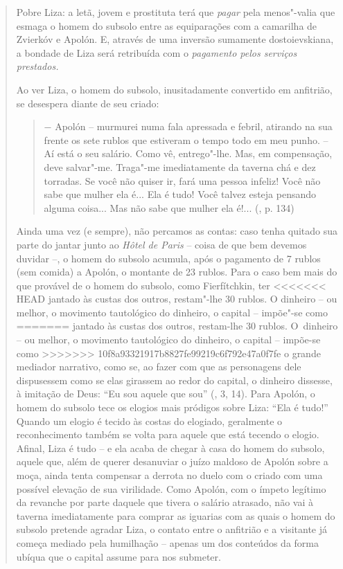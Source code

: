 {\begin{quote}
Pobre Liza: a letã, jovem e prostituta terá que \emph{pagar} pela
menos"-valia que esmaga o homem do subsolo entre as equiparações com a
camarilha de Zvierkóv e Apolón. E, através de uma inversão sumamente
dostoievskiana, a bondade de Liza será retribuída com o \emph{pagamento
pelos serviços prestados. }

Ao ver Liza, o homem do subsolo, inusitadamente convertido em anfitrião,
se desespera diante de seu criado:

\begin{quote}
− Apolón -- murmurei numa fala apressada e febril, atirando na sua
frente os sete rublos que estiveram o tempo todo em meu punho. -- Aí
está o seu salário. Como vê, entrego"-lhe. Mas, em compensação, deve
salvar"-me. Traga"-me imediatamente da taverna chá e dez torradas. Se você
não quiser ir, fará uma pessoa infeliz! Você não sabe que mulher ela
é... Ela é tudo! Você talvez esteja pensando alguma coisa... Mas não
sabe que mulher ela é!... (, p. 134)
\end{quote}

Ainda uma vez (e sempre), não percamos as contas: caso tenha quitado sua
parte do jantar junto ao \emph{Hôtel de Paris} -- coisa de que bem
devemos duvidar --, o homem do subsolo acumula, após o pagamento de 7
rublos (sem comida) a Apolón, o montante de 23 rublos. Para o caso bem
mais do que provável de o homem do subsolo, como Fierfítchkin, ter
<<<<<<< HEAD
jantado às custas dos outros, restam"-lhe 30 rublos. O dinheiro -- ou
melhor, o movimento tautológico do dinheiro, o capital -- impõe"-se como
=======
jantado às custas dos outros, restam-lhe 30 rublos. O~dinheiro -- ou
melhor, o movimento tautológico do dinheiro, o capital -- impõe-se como
>>>>>>> 10f8a93321917b8827fe99219c6f792e47a0f7fe
o grande mediador narrativo, como se, ao fazer com que as personagens
dele dispusessem como se elas girassem ao redor do capital, o dinheiro
dissesse, à imitação de Deus: ``Eu sou aquele que sou'' (, 3, 14).
Para Apolón, o homem do subsolo tece os elogios mais pródigos sobre
Liza: ``Ela é tudo!'' Quando um elogio é tecido às costas do elogiado,
geralmente o reconhecimento também se volta para aquele que está tecendo
o elogio. Afinal, Liza é tudo -- e ela acaba de chegar à casa do homem
do subsolo, aquele que, além de querer desanuviar o juízo maldoso de
Apolón sobre a moça, ainda tenta compensar a derrota no duelo com o
criado com uma possível elevação de sua virilidade. Como Apolón, com o
ímpeto legítimo da revanche por parte daquele que tivera o salário
atrasado, não vai à taverna imediatamente para comprar as iguarias com
as quais o homem do subsolo pretende agradar Liza, o contato entre o
anfitrião e a visitante já começa mediado pela humilhação -- apenas um
dos conteúdos da forma ubíqua que o capital assume para nos submeter.


\end{quote}}

